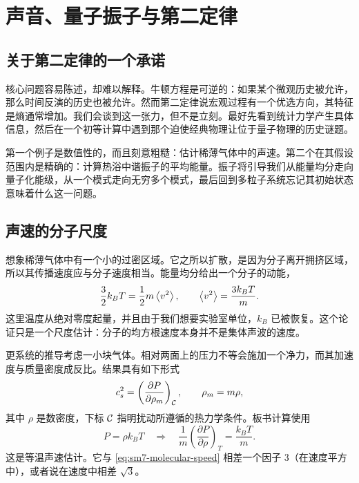 \chapter{声音、量子振子与第二定律}


\section{关于第二定律的一个承诺}

核心问题容易陈述，却难以解释。牛顿方程是可逆的：如果某个微观历史被允许，那么时间反演的历史也被允许。然而第二定律说宏观过程有一个优选方向，其特征是熵通常增加。我们会谈到这一张力，但不是立刻。最好先看到统计力学产生具体信息，然后在一个初等计算中遇到那个迫使经典物理让位于量子物理的历史谜题。

第一个例子是数值性的，而且刻意粗糙：估计稀薄气体中的声速。第二个在其假设范围内是精确的：计算热浴中谐振子的平均能量。振子将引导我们从能量均分走向量子化能级，从一个模式走向无穷多个模式，最后回到多粒子系统忘记其初始状态意味着什么这一问题。

\section{声速的分子尺度}

想象稀薄气体中有一个小的过密区域。它之所以扩散，是因为分子离开拥挤区域，所以其传播速度应与分子速度相当。能量均分给出一个分子的动能，
\begin{equation}
 \frac{3}{2}k_B T
 =\frac{1}{2}m\left\langle v^2\right\rangle,
 \qquad
 \left\langle v^2\right\rangle=\frac{3k_B T}{m}.
 \label{eq:sm7-molecular-speed}
\end{equation}
这里温度从绝对零度起量，并且由于我们想要实验室单位，\(k_B\) 已被恢复。这个论证只是一个尺度估计：分子的均方根速度本身并不是集体声波的速度。

更系统的推导考虑一小块气体。相对两面上的压力不等会施加一个净力，而其加速度与质量密度成反比。结果具有如下形式
\begin{equation}
 c_s^2=
 \left(\frac{\partial P}{\partial \rho_m}\right)_{\cal C},
 \qquad
 \rho_m=m\rho,
 \label{eq:sm7-sound-general}
\end{equation}
其中 \(\rho\) 是数密度，下标 \({\cal C}\) 指明扰动所遵循的热力学条件。板书计算使用
\begin{equation}
 P=\rho k_B T
 \quad\Longrightarrow\quad
 \frac{1}{m}
 \left(\frac{\partial P}{\partial\rho}\right)_T
 =\frac{k_B T}{m}.
 \label{eq:sm7-sound-isothermal}
\end{equation}
这是等温声速估计。它与 \eqref{eq:sm7-molecular-speed} 相差一个因子 \(3\)（在速度平方中），或者说在速度中相差 \(\sqrt{3}\)。

